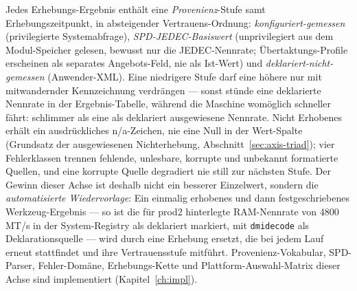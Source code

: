 \begin{nurlang}
Jedes Erhebungs-Ergebnis enthält eine \emph{Provenienz}-Stufe samt Erhebungszeitpunkt, in
absteigender Vertrauens-Ordnung: \emph{konfiguriert-gemessen} (privilegierte Systemabfrage),
\emph{SPD-JEDEC-Basiswert} (unprivilegiert aus dem Modul-Speicher gelesen, bewusst nur die
JEDEC-Nennrate; Übertaktungs-Profile erscheinen als separates Angebots-Feld, nie als Ist-Wert) und
\emph{deklariert-nicht-gemessen} (Anwender-XML). Eine niedrigere Stufe darf eine höhere nur mit
mitwandernder Kennzeichnung verdrängen --- sonst stünde eine deklarierte Nennrate in der
Ergebnis-Tabelle, während die Maschine womöglich schneller fährt: schlimmer als eine als deklariert ausgewiesene Nennrate.
Nicht Erhobenes erhält ein ausdrückliches n/a-Zeichen, nie eine Null in der Wert-Spalte
(Grundsatz der ausgewiesenen Nichterhebung, Abschnitt~\ref{sec:axis-triad}); vier Fehlerklassen trennen
fehlende, unlesbare, korrupte und unbekannt formatierte Quellen, und eine korrupte Quelle degradiert nie
still zur nächsten Stufe. Der Gewinn dieser Achse ist deshalb nicht ein besserer Einzelwert,
sondern die \emph{automatisierte Wiedervorlage}: Ein einmalig erhobenes und dann festgeschriebenes
Werkzeug-Ergebnis --- so ist die für prod2 hinterlegte RAM-Nennrate von 4800\,MT/s in der System-Registry
als deklariert markiert, mit \texttt{dmidecode} als Deklarationsquelle --- wird durch eine Erhebung
ersetzt, die bei jedem Lauf erneut stattfindet und ihre Vertrauensstufe mitführt. Provenienz-Vokabular,
SPD-Parser, Fehler-Domäne, Erhebungs-Kette und Plattform-Auswahl-Matrix dieser Achse sind implementiert
(Kapitel~\ref{ch:impl}).

\end{nurlang}
